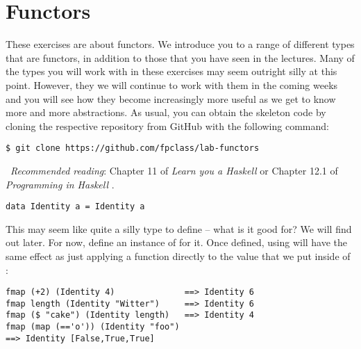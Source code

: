 \section{Functors}

These exercises are about functors. We introduce you to a range of different types that are functors, in addition to those that you have seen in the lectures. Many of the types you will work with in these exercises may seem outright silly at this point. However, they we will continue to work with them in the coming weeks and you will see how they become increasingly more useful as we get to know more and more abstractions. As usual, you can obtain the skeleton code by cloning the respective repository from GitHub with the following command:
\begin{verbatim}
$ git clone https://github.com/fpclass/lab-functors
\end{verbatim}

\makebox[0.5cm]{\faBook}~\emph{Recommended reading}: Chapter 11 of \emph{Learn you a Haskell} \citep{lipovaca2011learn} or Chapter 12.1 of \emph{Programming in Haskell} \citep{hutton2016programming}.

\taskLine

\begin{verbatim}
data Identity a = Identity a
\end{verbatim}
This may seem like quite a silly type to define -- what is it good for? We will find out later. For now, define an instance of  for it. Once defined, using  will have the same effect as just applying a function directly to the value that we put inside of :
\begin{verbatim}
fmap (+2) (Identity 4)              ==> Identity 6
fmap length (Identity "Witter")     ==> Identity 6
fmap ($ "cake") (Identity length)   ==> Identity 4
fmap (map (=='o')) (Identity "foo") 
==> Identity [False,True,True]
\end{verbatim} 


